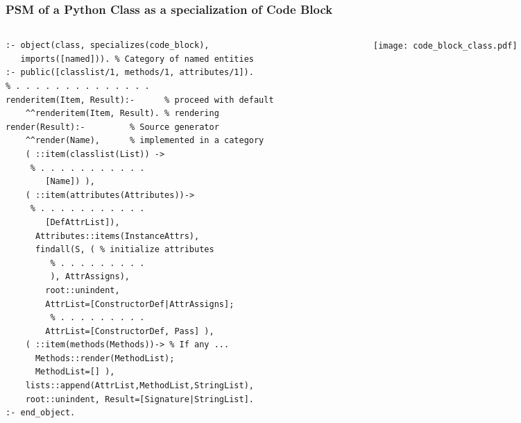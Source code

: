\documentclass[10pt]{beamer}
\begin{document}
\begin{frame}[fragile]
  \frametitle{PSM of a Python Class as a specialization of Code Block}
  \begin{columns}
    \begin{column}{0.6\textwidth}
      \flushleft
\begin{verbatim}
:- object(class, specializes(code_block),
   imports([named])). % Category of named entities
:- public([classlist/1, methods/1, attributes/1]).
% . . . . . . . . . . . . . .
renderitem(Item, Result):-      % proceed with default
    ^^renderitem(Item, Result). % rendering
render(Result):-         % Source generator
    ^^render(Name),      % implemented in a category
    ( ::item(classlist(List)) ->
     % . . . . . . . . . . .
        [Name]) ),
    ( ::item(attributes(Attributes))->
     % . . . . . . . . . . .
        [DefAttrList]),
      Attributes::items(InstanceAttrs),
      findall(S, ( % initialize attributes
         % . . . . . . . . .
         ), AttrAssigns),
        root::unindent,
        AttrList=[ConstructorDef|AttrAssigns];
         % . . . . . . . . .
        AttrList=[ConstructorDef, Pass] ),
    ( ::item(methods(Methods))-> % If any ...
      Methods::render(MethodList);
      MethodList=[] ),
    lists::append(AttrList,MethodList,StringList),
    root::unindent, Result=[Signature|StringList].
:- end_object.
\end{verbatim}
    \end{column}
    \begin{column}{0.4\linewidth}
      \texttt{[image: code\_block\_class.pdf]}
    \end{column}
  \end{columns}
\end{frame}
\end{document}
